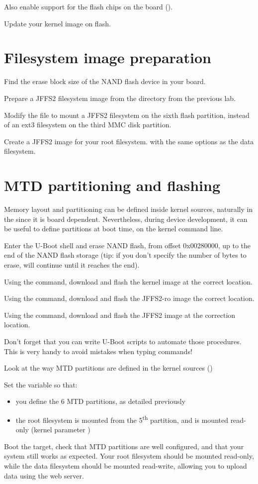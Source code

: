 Also enable support for the flash chips on the board
().

Update your kernel image on flash.

\section{Filesystem image preparation}

Find the erase block size of the NAND flash device in your board.

Prepare a JFFS2 filesystem image from the 
directory from the previous lab.

Modify the  file to mount a JFFS2 filesystem on
the sixth flash partition, instead of an ext3 filesystem on the third
MMC disk partition.

Create a JFFS2 image for your root filesystem. with the same options
as the data filesystem.

\section{MTD partitioning and flashing}

Memory layout and partitioning can be defined inside kernel sources,
naturally in the  since it is
board dependent. Nevertheless, during device development, it can be
useful to define partitions at boot time, on the kernel command line.

Enter the U-Boot shell and erase NAND flash, from offset
0x00280000, up to the end of the NAND flash storage (tip: if you don't
specify the number of bytes to erase,  will
continue until it reaches the end).

Using the  command, download and flash the kernel image at
the correct location.

Using the  command, download and flash the JFFS2-ro image
the correct location.

Using the  command, download and flash the JFFS2 image at
the correction location.

Don't forget that you can write U-Boot scripts to automate those
procedures. This is very handy to avoid mistakes when typing commands!

Look at the way MTD partitions are defined in the kernel sources
()

Set the  variable so that:

\begin{itemize}
\item you define the 6 MTD partitions, as detailed previously
\item the root filesystem is mounted from the 5\textsuperscript{th}
  partition, and is mounted read-only (kernel parameter )
\end{itemize}

Boot the target, check that MTD partitions are well configured, and
that your system still works as expected. Your root filesystem should
be mounted read-only, while the data filesystem should be mounted
read-write, allowing you to upload data using the web server.
